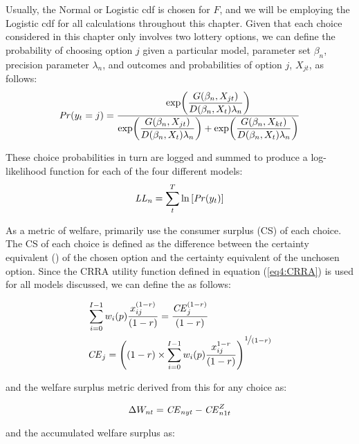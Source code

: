 \documentclass[../main.tex]{subfiles}
\begin{document}
Usually, the Normal or Logistic cdf is chosen for $F$, and we will be employing the Logistic cdf for all calculations throughout this chapter.
Given that each choice considered in this chapter only involves two lottery options, we can define the probability of choosing option $j$ given a particular model, parameter set $\beta_n$, precision parameter $\lambda_n$, and outcomes and probabilities of option $j$, $X_{jt}$, as follows:
\begin{equation}
	\label{eq4:RE.f}
	{\ensuremath{\mathit{Pr}}}(y_t=j) =\dfrac{\exp\!\left( \dfrac{ G(\beta_n,X_{jt}) }{ D(\beta_n,X_{t})\lambda_n }  \right)}{  \exp\!\left( \dfrac{ G(\beta_n,X_{jt}) }{ D(\beta_n,X_{t})\lambda_n }  \right) + \exp\!\left( \dfrac{ G(\beta_n,X_{kt}) }{ D(\beta_n,X_{t})\lambda_n }  \right)    }
\end{equation}

These choice probabilities in turn are logged and summed to produce a log-likelihood function for each of the four different models:
\begin{equation}
	\label{eq4:ll}
	\mathit{LL_n} = \sum_{t}^T \ln \left[ {\mathit{Pr}}(y_t) \right]
\end{equation}

As a metric of welfare, \textcite{Harrison2016} primarily use the consumer surplus (CS) of each choice.
The CS of each choice is defined as the difference between the certainty equivalent ({\CE}) of the chosen option and the certainty equivalent of the unchosen option.
Since the CRRA utility function defined in equation (\ref{eq4:CRRA}) is used for all models discussed, we can define the {\CE} as follows:

\begin{align}
	\label{eq4:CEcalc}
	\begin{split}
		&\sum_{i=0}^{I-1} w_i(p) \frac{x_{ij}^{(1-r)}}{(1-r)} = \frac{ {\mathit{CE}}_j^{(1-r)}}{(1-r)}\\
		&{\mathit{CE}}_j =  \left( (1-r) \times \sum_{i=0}^{I-1} w_i(p) \frac{x_{ij}^{1-r}}{(1-r)} \right)^{ \displaystyle\nicefrac{1}{(1-r)} }
	\end{split}
\end{align}

\noindent and the welfare surplus metric derived from this {\CE} for any choice as:

\begin{equation}
	\label{eq4:wsurplus}
	\Delta W_{nt} =  {\mathit{CE}}_{nyt} - {\mathit{CE}}_{n1t}^Z
\end{equation}

\noindent and the accumulated welfare surplus as:
\end{document}
